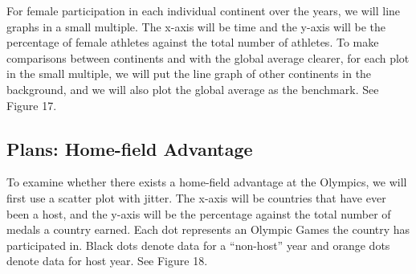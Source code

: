 \documentclass[12pt]{article}
\begin{document}
For female participation in each individual continent over the years, we will line graphs in a small multiple. The x-axis will be time and the y-axis will be the percentage of female athletes against the total number of athletes. To make comparisons between continents and with the global average clearer, for each plot in the small multiple, we will put the line graph of other continents in the background, and we will also plot the global average as the benchmark. See Figure 17.

\subsection{Plans: Home-field Advantage}

To examine whether there exists a home-field advantage at the Olympics, we will first use a scatter plot with jitter. The x-axis will be countries that have ever been a host, and the y-axis will be the percentage against the total number of medals a country earned. Each dot represents an Olympic Games the country has participated in. Black dots denote data for a “non-host” year and orange dots denote data for host year. See Figure 18.
\end{document}
